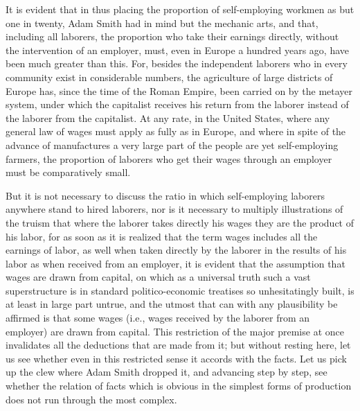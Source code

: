 It is evident that in thus placing the proportion of self-employing
workmen as but one in twenty, Adam Smith had in mind but the mechanic
arts, and that, including all laborers, the proportion who take their
earnings directly, without the intervention of an employer, must, even
in Europe a hundred years ago, have been much greater than this. For,
besides the independent laborers who in every community exist in
considerable numbers, the agriculture of large districts of Europe has,
since the time of the Roman Empire, been carried on by the metayer
system, under which the capitalist receives his return from the laborer
instead of the laborer from the capitalist. At any rate, in the United
States, where any general law of wages must apply as fully as in Europe,
and where in spite of the advance of manufactures a very large part of
the people are yet self-employing farmers, the proportion of laborers
who get their wages through an employer must be comparatively small.

But it is not necessary to discuss the ratio in which self-employing
laborers anywhere stand to hired laborers, nor is it necessary to
multiply illustrations of the truism that where the laborer takes
directly his wages they are the product of his labor, for as soon as it
is realized that the term wages includes all the earnings of labor, as
well when taken directly by the laborer in the results of his labor as
when received from an employer, it is evident that the assumption that
wages are drawn from capital, on which as a universal truth such a vast
superstructure is in standard politico-economic treatises so
unhesitatingly built, is at least in large part untrue, and the utmost
that can with any plausibility be affirmed is that some wages (i.e.,
wages received by the laborer from an employer) are drawn from capital.
This restriction of the major premise at once invalidates all the
deductions that are made from it; but without resting here, let us see
whether even in this restricted sense it accords with the facts. Let us
pick up the clew where Adam Smith dropped it, and advancing step by
step, see whether the relation of facts which is obvious in the simplest
forms of production does not run through the most complex.

